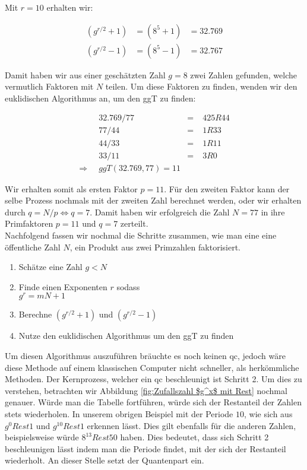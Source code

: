 Mit $r = 10$ erhalten wir:

\begin{align*}
    (g^{r/2} + 1) &= (8^5 + 1) &= 32.769 \\
    (g^{r/2} - 1) &= (8^5 - 1) &= 32.767
\end{align*}

Damit haben wir aus einer geschätzten Zahl $g = 8$ zwei Zahlen gefunden, welche vermutlich Faktoren mit $N$ teilen. 
Um diese Faktoren zu finden, wenden wir den euklidischen Algorithmus an, um den \ac*{ggT} zu finden:

\begin{align*}
    & 32.769 / 77 &=\;&  425 R 44    \\
    & 77 / 44     &=\;&  1 R 33      \\
    & 44 / 33     &=\;&  1 R 11      \\
    & 33 / 11     &=\;&  3 R 0       \\
    \Rightarrow\;\; & ggT(32.769, 77) = 11
\end{align*}

Wir erhalten somit als ersten Faktor $p = 11$. 
Für den zweiten Faktor kann der selbe Prozess nochmals mit der zweiten Zahl berechnet werden, oder wir erhalten durch $q = N/p \Leftrightarrow q = 7$. 
Damit haben wir erfolgreich die Zahl $N = 77$ in ihre Primfaktoren $p=11$ und $q=7$ zerteilt.\\


Nachfolgend fassen wir nochmal die Schritte zusammen, wie man eine eine öffentliche Zahl $N$, ein Produkt aus zwei Primzahlen faktorisiert.

\begin{enumerate}
    \item Schätze eine Zahl $g < N$
    \item Finde einen Exponenten $r$ sodass\\$g^r = mN + 1$
    \item Berechne $(g^{r/2} + 1)$ und $(g^{r/2} - 1)$
    \item Nutze den euklidischen Algorithmus um den \ac{ggT} zu finden\\
\end{enumerate}

Um diesen Algorithmus auszuführen bräuchte es noch keinen \ac{qc}, jedoch wäre diese Methode auf einem klassischen Computer nicht schneller, als herkömmliche Methoden. 
Der Kernprozess, welcher ein \ac{qc} beschleunigt ist Schritt 2. Um dies zu verstehen, betrachten wir Abbildung \ref{fig:Zufallszahl $g^x$ mit Rest} nochmal genauer. 
Würde man die Tabelle fortführen, würde sich der Restanteil der Zahlen stets wiederholen. In unserem obrigen Beispiel mit der Periode $10$, 
wie sich aus $g^0 Rest 1$ und $g^{10} Rest 1$ erkennen lässt. Dies gilt ebenfalls für die anderen Zahlen, beispielsweise würde $8^{13} Rest 50$ haben.
Dies bedeutet, dass sich Schritt 2 beschleunigen lässt indem man die Periode findet, mit der sich der Restanteil wiederholt. 
An dieser Stelle setzt der Quantenpart ein.\\

